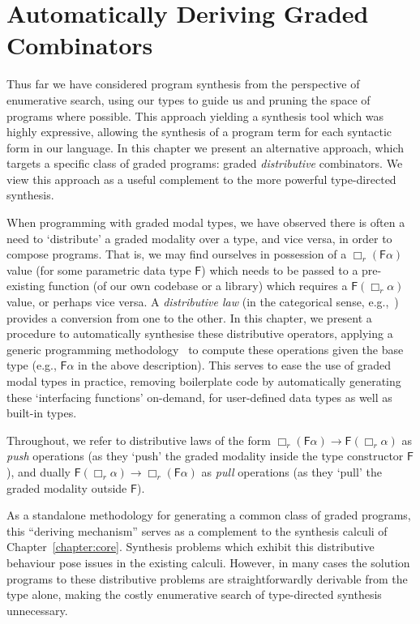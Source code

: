 \chapter{Automatically Deriving Graded Combinators}         
\label{chapter:deriving}
Thus far we have considered program synthesis from the perspective of
enumerative search, using our types to guide us and pruning the space of
programs where possible. This approach yielding a synthesis tool which was
highly expressive, allowing the synthesis of a program term for each syntactic
form in our language. In this chapter we present an alternative approach, which
targets a specific class of graded programs: graded \emph{distributive}
combinators. We view this approach as a useful complement to the more powerful
type-directed synthesis. 

When programming with graded modal types, we have observed there is often a need
to `distribute' a graded modality over a type, and vice versa, in order to
compose programs. That is, we may find ourselves in possession of a $\Box_r
(\mathsf{F} \alpha)$ value (for some parametric data type $\mathsf{F}$) which
needs to be passed to a pre-existing function (of our own codebase or a library)
which requires a $\mathsf{F} (\Box_r \alpha)$ value, or perhaps vice versa. A
\emph{distributive law} (in the categorical sense,
e.g.,~\citet{street1972formal}) provides a conversion from one to the other. In
this chapter, we present a procedure to automatically synthesise these
distributive operators, applying a generic programming
methodology~\citep{hinze2000new} to compute these operations given the base type
(e.g., $\mathsf{F} \alpha$ in the above description). This serves to ease the
use of graded modal types in practice, removing boilerplate code by
automatically generating these `interfacing functions' on-demand, for
user-defined data types as well as built-in types.

Throughout, we refer to distributive laws of the form $\Box_r (\mathsf{F}
\alpha) \rightarrow \mathsf{F} (\Box_r \alpha)$ as \emph{push} operations (as
they `push' the graded modality inside the type constructor $\mathsf{F}$), and
dually $\mathsf{F} (\Box_r \alpha) \rightarrow \Box_r (\mathsf{F} \alpha)$ as
\emph{pull} operations (as they `pull' the graded modality outside $\mathsf{F}$).

As a standalone methodology for generating a common class of graded programs,
this ``deriving mechanism'' serves as a complement to the synthesis calculi of
Chapter~\ref{chapter:core}. Synthesis problems which exhibit this distributive
behaviour pose issues in the existing calculi. However, in many cases the
solution programs to these distributive problems are straightforwardly derivable
from the type alone, making the costly enumerative search of type-directed synthesis
unnecessary.


